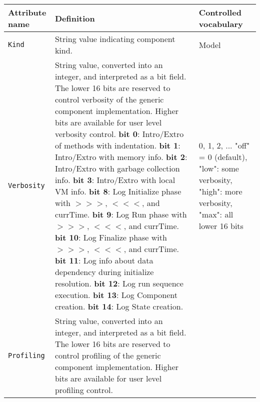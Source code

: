 \begin{longtable}{|p{}|p{}|p{}|}
     \hline\hline
     {\bf Attribute name} & {\bf Definition} & {\bf Controlled vocabulary}\\
     \hline\hline
     {\tt Kind} & String value indicating component kind.& Model\\ \hline
     {\tt Verbosity} & String value, converted into an integer, and interpreted as a bit field. The lower 16 bits are reserved to control verbosity of the generic component implementation. Higher bits are available for user level verbosity control. \newline
                       {\bf bit 0}: Intro/Extro of methods with indentation.\newline
                       {\bf bit 1}: Intro/Extro with memory info.\newline
                       {\bf bit 2}: Intro/Extro with garbage collection info.\newline
                       {\bf bit 3}: Intro/Extro with local VM info.\newline
                       {\bf bit 8}: Log Initialize phase with $>>>$, $<<<$, and currTime.\newline
                       {\bf bit 9}: Log Run phase with $>>>$, $<<<$, and currTime.\newline
                       {\bf bit 10}: Log Finalize phase with $>>>$, $<<<$, and currTime.\newline
                       {\bf bit 11}: Log info about data dependency during initialize resolution.\newline
                       {\bf bit 12}: Log run sequence execution.\newline
                       {\bf bit 13}: Log Component creation.\newline
                       {\bf bit 14}: Log State creation.
                     & 0, 1, 2, ... \newline
                       "off" = 0 (default), \newline
                       "low": some verbosity, \newline
                       "high": more verbosity, \newline
                       "max": all lower 16 bits\\ \hline
     {\tt Profiling} & String value, converted into an integer, and interpreted as a bit field. The lower 16 bits are reserved to control profiling of the generic component implementation. Higher bits are available for user level profiling control.

\end{longtable}
